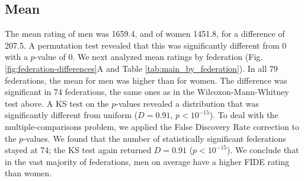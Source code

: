 \documentclass[9pt,twocolumn,twoside,lineno]{pnas-new}
\begin{document}
\subsection*{Mean}
The mean rating of men was 1659.4, and of women 1451.8, for a difference of 207.5.  A permutation test revealed that this was significantly different from 0 with a $p$-value of 0.  We next analyzed mean ratings by federation (Fig. \ref{fig:federation-differences}A and Table \ref{tab:main_by_federation}). In all 79 federations, the mean for men was higher than for women. The difference was significant in 74  federations, the same ones as in the Wilcoxon-Mann-Whitney test above. A KS test on the $p$-values revealed a distribution that was significantly different from uniform ($D = 0.91$, $p < 10^{-15}$). To deal with the multiple-comparisons problem, we applied the False Discovery Rate correction \cite{BH95} to the $p$-values. We found that the number of statistically significant federations stayed at 74; the KS test again returned $D = 0.91$ ($p < 10^{-15}$). We conclude that in the vast majority of federations, men on average have a higher FIDE rating than women.
\end{document}
